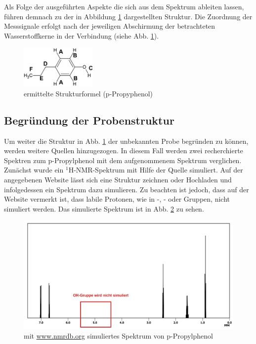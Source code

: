  Als Folge der ausgeführten Aspekte die sich aus dem Spektrum ableiten lassen, führen demnach zu der in Abbildung \ref{fig:struktur_linear} dargestellten Struktur. Die Zuordnung der Messsignale erfolgt nach der jeweiligen Abschirmung der betrachteten Wasserstoffkerne in der Verbindung (siehe Abb. \ref{fig:struktur_linear}).
 
\begin{figure}[h!]
	\centering
	\includegraphics[width=0.33\textwidth]{img/struktur_linear_b.png}
	\caption{ermittelte Strukturformel (p-Propyphenol)}
	\label{fig:struktur_linear}
\end{figure}
\FloatBarrier

\subsection{Begründung der Probenstruktur}
Um weiter die Struktur in Abb. \ref{fig:struktur_linear} der unbekannten Probe begründen zu können, werden weitere Quellen hinzugezogen. In diesem Fall werden zwei recherchierte Spektren zum p-Propylphenol mit dem aufgenommenem Spektrum verglichen.
Zunächst wurde ein ${}^1$H-NMR-Spektrum mit Hilfe der Quelle \cite{Patiny.30.06.2021} simuliert. Auf der angegebenen Website lässt sich eine Struktur zeichnen oder Hochladen und infolgedessen ein Spektrum dazu simulieren. Zu beachten ist jedoch, dass auf der Website vermerkt ist, dass labile Protonen, wie in -, - oder Gruppen, nicht simuliert werden.
Das simulierte Spektrum ist in Abb. \ref{fig:spektrum_simuliert} zu sehen.
\begin{figure}[h!]
	\centering
	\includegraphics[width=\textwidth]{img/spektrum_simuliert_gesamt_oh.png}
	\caption{mit \url{www.nmrdb.org} simuliertes Spektrum von p-Propylphenol \cite{Patiny.30.06.2021}}
	\label{fig:spektrum_simuliert}
\end{figure}

